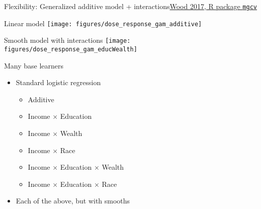 \documentclass{beamer}
\begin{document}
\begin{frame}{Flexibility: Generalized additive model + interactions}{\href{https://www.taylorfrancis.com/books/mono/10.1201/9781315370279/generalized-additive-models-simon-wood}{Wood 2017, R package \texttt{mgcv}}}
\end{frame}

\begin{frame}{Linear model}
\texttt{[image: figures/dose\_response\_gam\_additive]}
\end{frame}

\begin{frame}{Smooth model with interactions}
\texttt{[image: figures/dose\_response\_gam\_educWealth]}
\end{frame}

\begin{frame}{Many base learners}

\begin{itemize}
\item Standard logistic regression
\begin{itemize}
\item Additive
\item Income $\times$ Education
\item Income $\times$ Wealth
\item Income $\times$ Race
\item Income $\times$ Education $\times$ Wealth
\item Income $\times$ Education $\times$ Race
\end{itemize}
\item Each of the above, but with smooths
\end{itemize}

\end{frame}
\end{document}
